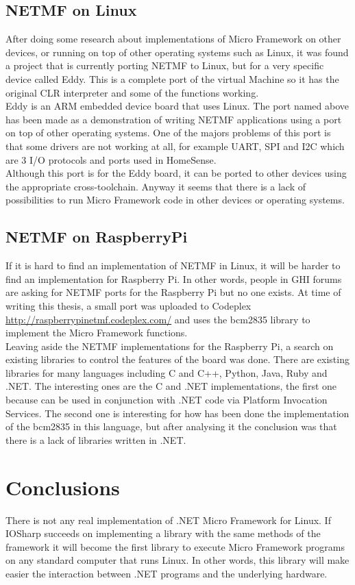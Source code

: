 \subsection{NETMF on Linux}\label{SS:SOTA-NETMF-Linux}
After doing some research about implementations of Micro Framework on other devices, or running on top of other operating systems such as Linux, it was found a project that is currently porting NETMF to Linux, but for a very specific device called Eddy. This is a complete port of the virtual Machine so it has the original CLR interpreter and some of the functions working.
\\
Eddy is an ARM embedded device board that uses Linux. The port named above has been made as a demonstration of writing NETMF applications using a port on top of other operating systems. One of the majors problems of this port is that some drivers are not working at all, for example UART, SPI and \gls{I2C} which are 3 I/O protocols and ports used in HomeSense.
\\
Although this port is for the Eddy board, it can be ported to other devices using the appropriate cross-toolchain. Anyway it seems that there is a lack of possibilities to run Micro Framework code in other devices or operating systems.

\subsection{NETMF on RaspberryPi}\label{SS:SOTA-NETMF-RPI}
If it is hard to find an implementation of NETMF in Linux, it will be harder to find an implementation for Raspberry Pi. In other words, people in GHI forums are asking for NETMF ports for the Raspberry Pi but no one exists. At time of writing this thesis, a small port was uploaded to Codeplex \url{http://raspberrypinetmf.codeplex.com/} and uses the bcm2835 library to implement the Micro Framework functions.
\\
Leaving aside the NETMF implementations for the Raspberry Pi, a search on existing libraries to control the features of the board was done. There are existing libraries for many languages including C and C++, Python, Java, Ruby and .NET. The interesting ones are the C and .NET implementations, the first one because can be used in conjunction with .NET code via Platform Invocation Services. The second one is interesting for how has been done the implementation of the bcm2835 in this language, but after analysing it the conclusion was that there is a lack of libraries written in .NET.

\section{Conclusions}\label{S:SOTA-Conclusions}
There is not any real implementation of .NET Micro Framework for Linux. If IOSharp succeeds on implementing a library with the same methods of the framework it will become the first library to execute Micro Framework programs on any standard computer that runs Linux. In other words, this library will make easier the interaction between .NET programs and the underlying hardware.